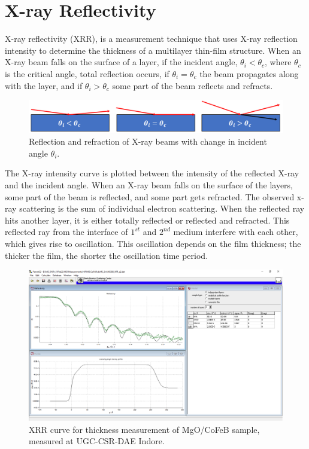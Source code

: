\documentclass[12pt,a4paper,bold]{thesis}
\theoremstyle{thm}
\theoremstyle{definition}
\begin{document}
\section{X-ray Reflectivity}
\indent \indent \indent X-ray reflectivity (XRR), is a measurement technique that uses X-ray reflection intensity to determine the thickness of a multilayer thin-film structure. 
When an X-ray beam falls on the surface of a layer, if the incident angle, $\theta_i<\theta_c$, where $\theta_c$ is the critical angle, total reflection occurs, if $\theta_i=\theta_c$ the beam propagates along with the layer, and if $\theta_i>\theta_c$ some part of the beam reflects and refracts.
\begin{figure}[H]
	\centering
   \includegraphics[width=12cm]{Images/64.png} 
   \caption{Reflection and refraction of X-ray beams with change in incident angle $\theta_i$.}
\end{figure}
\indent\indent The X-ray intensity curve is plotted between the intensity of the reflected X-ray and the incident angle. When an X-ray beam falls on the surface of the layers, some part of the beam is reflected, and some part gets refracted. The observed x-ray scattering is the sum of individual electron scattering. When the reflected ray hits another layer, it is either totally reflected or reflected and refracted. This reflected ray from the interface of $1^{st}$ and $2^{nd}$ medium interfere with each other, which gives rise to oscillation. This oscillation depends on the film thickness; the thicker the film, the shorter the oscillation time period.
\begin{figure}[H]
	\centering
   \includegraphics[width=12cm]{Images/65.png} 
   \caption{XRR curve for thickness measurement of MgO/CoFeB sample, measured at UGC-CSR-DAE Indore.}
\end{figure}
\pagebreak
\end{document}
